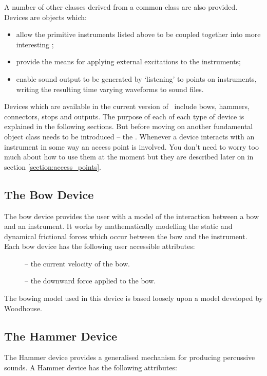 A number of other classes derived from a common  class
are also provided. Devices are objects which:

\begin{itemize}
\item
allow the primitive instruments listed above to be coupled together into more
interesting ;
\item 
provide the means for applying external excitations to the instruments;
\item
enable sound output to be generated by `listening' to points on instruments,
writing the resulting time varying waveforms to sound files.
\end{itemize}

Devices which are available in the current version of
\tao\ include bows, hammers, connectors, stops and outputs.
The purpose of each of each type of device is explained in the
following sections. But before moving on another fundamental
object class needs to be introduced -- the .
Whenever a device interacts with an instrument in some way an
access point is involved. You don't need to worry too much
about how to use them at the moment but they are described
later on in section \ref{section:access_points}.

\subsection*{The Bow Device}
\label{section:bow_device}
The bow device provides the user with a model of the interaction
between a bow and an instrument. It works by mathematically modelling the
static and dynamical frictional forces which occur between the bow and the
instrument. Each bow device has the following user accessible
attributes:

\begin{description}
\item[] -- the current velocity of the bow.
\item[] -- the downward force applied to the bow. 
\end{description}

The bowing model used in this device is based loosely upon a model
developed by Woodhouse.

\subsection*{The Hammer Device}
\label{section:hammer_device}
The Hammer device provides a generalised mechanism for producing
percussive sounds. A Hammer device has the following attributes:

